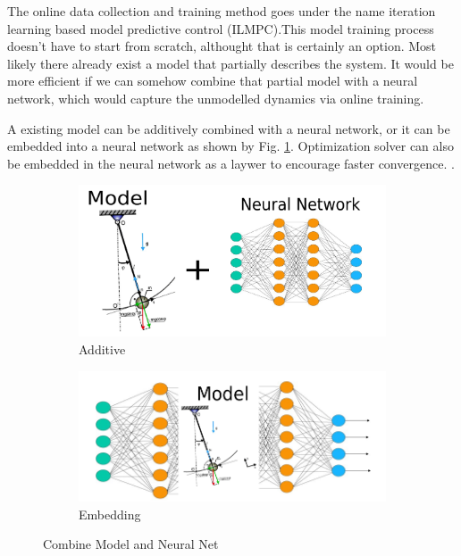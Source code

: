 \documentclass[journal]{IEEEtran}
\begin{document}
The online data collection and training method goes under the name iteration learning based model predictive control (ILMPC).This model training process doesn't have to start from scratch, althought that is certainly an option. Most likely there already exist a model that partially describes the system. It would be more efficient if we can somehow combine that partial model with a neural network, which would capture the unmodelled dynamics via online training.

A existing model can be additively combined \cite{Hewing2020LearningBasedMP} with a neural network, or it can be embedded into a neural network \cite{Mohan2020EmbeddingHP} as shown by Fig. \ref{fig:combine}. Optimization solver can also be embedded in the neural network as a laywer to encourage faster convergence. \cite{BelbutePeres2018EndtoEndDP} \cite{BelbutePeres2020CombiningDP} \cite{Agrawal2019DifferentiableCO}.

\begin{figure}[H]
\centering
\begin{subfigure}{0.25\textwidth}
  \centering
  \includegraphics[width=\linewidth]{combine1.png}
  \caption{Additive}
\end{subfigure}%
\begin{subfigure}{.25\textwidth}
  \centering
  \includegraphics[width=\linewidth]{combine2.png}
  \caption{Embedding}
\end{subfigure}
\caption{Combine Model and Neural Net}
\label{fig:combine}
\end{figure}
\end{document}
